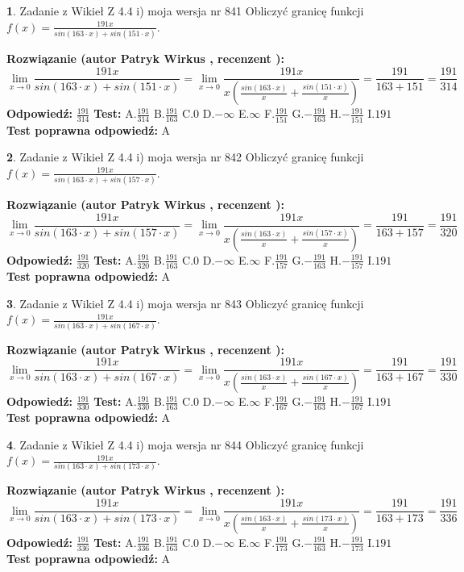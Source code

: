 \documentclass[12pt, a4paper]{article}
\theoremstyle{definition} %
\newtheorem{zad}{}
\newcommand{\zadStart}[1]{\begin{zad}#1\newline}
\newcommand{\zadStop}{\end{zad}}
\newcommand{\rozwStart}[2]{\noindent \textbf{Rozwiązanie (autor #1 , recenzent #2): }\newline}
\newcommand{\rozwStop}{\newline}
\newcommand{\odpStart}{\noindent \textbf{Odpowiedź:}\newline}
\newcommand{\odpStop}{\newline}
\newcommand{\testStart}{\noindent \textbf{Test:}\newline}
\newcommand{\testStop}{\newline}
\newcommand{\kluczStart}{\noindent \textbf{Test poprawna odpowiedź:}\newline}
\newcommand{\kluczStop}{\newline}
\begin{document}
\zadStart{Zadanie z Wikieł Z 4.4 i) moja wersja nr 841}
Obliczyć granicę funkcji $f(x)=\frac{191x}{sin(163\cdot x) +sin(151\cdot x)}$.
\zadStop
\rozwStart{Patryk Wirkus}{}
$$\lim\limits_{x\to 0}\frac{191x}{sin(163\cdot x) +sin(151\cdot x)}=\lim\limits_{x\to 0}\frac{191x}{x(\frac{sin(163\cdot x)}{x}+\frac{sin(151\cdot x)}{x})}=\frac{191}{163+151} = \frac{191}{314}$$
\rozwStop
\odpStart
$\frac{191}{314}$
\odpStop
\testStart
A.$\frac{191}{314}$
B.$\frac{191}{163}$
C.$0$
D.$-\infty$
E.$\infty$
F.$\frac{191}{151}$
G.$-\frac{191}{163}$
H.$-\frac{191}{151}$
I.$191$
\testStop
\kluczStart
A
\kluczStop



\zadStart{Zadanie z Wikieł Z 4.4 i) moja wersja nr 842}
Obliczyć granicę funkcji $f(x)=\frac{191x}{sin(163\cdot x) +sin(157\cdot x)}$.
\zadStop
\rozwStart{Patryk Wirkus}{}
$$\lim\limits_{x\to 0}\frac{191x}{sin(163\cdot x) +sin(157\cdot x)}=\lim\limits_{x\to 0}\frac{191x}{x(\frac{sin(163\cdot x)}{x}+\frac{sin(157\cdot x)}{x})}=\frac{191}{163+157} = \frac{191}{320}$$
\rozwStop
\odpStart
$\frac{191}{320}$
\odpStop
\testStart
A.$\frac{191}{320}$
B.$\frac{191}{163}$
C.$0$
D.$-\infty$
E.$\infty$
F.$\frac{191}{157}$
G.$-\frac{191}{163}$
H.$-\frac{191}{157}$
I.$191$
\testStop
\kluczStart
A
\kluczStop



\zadStart{Zadanie z Wikieł Z 4.4 i) moja wersja nr 843}
Obliczyć granicę funkcji $f(x)=\frac{191x}{sin(163\cdot x) +sin(167\cdot x)}$.
\zadStop
\rozwStart{Patryk Wirkus}{}
$$\lim\limits_{x\to 0}\frac{191x}{sin(163\cdot x) +sin(167\cdot x)}=\lim\limits_{x\to 0}\frac{191x}{x(\frac{sin(163\cdot x)}{x}+\frac{sin(167\cdot x)}{x})}=\frac{191}{163+167} = \frac{191}{330}$$
\rozwStop
\odpStart
$\frac{191}{330}$
\odpStop
\testStart
A.$\frac{191}{330}$
B.$\frac{191}{163}$
C.$0$
D.$-\infty$
E.$\infty$
F.$\frac{191}{167}$
G.$-\frac{191}{163}$
H.$-\frac{191}{167}$
I.$191$
\testStop
\kluczStart
A
\kluczStop



\zadStart{Zadanie z Wikieł Z 4.4 i) moja wersja nr 844}
Obliczyć granicę funkcji $f(x)=\frac{191x}{sin(163\cdot x) +sin(173\cdot x)}$.
\zadStop
\rozwStart{Patryk Wirkus}{}
$$\lim\limits_{x\to 0}\frac{191x}{sin(163\cdot x) +sin(173\cdot x)}=\lim\limits_{x\to 0}\frac{191x}{x(\frac{sin(163\cdot x)}{x}+\frac{sin(173\cdot x)}{x})}=\frac{191}{163+173} = \frac{191}{336}$$
\rozwStop
\odpStart
$\frac{191}{336}$
\odpStop
\testStart
A.$\frac{191}{336}$
B.$\frac{191}{163}$
C.$0$
D.$-\infty$
E.$\infty$
F.$\frac{191}{173}$
G.$-\frac{191}{163}$
H.$-\frac{191}{173}$
I.$191$
\testStop
\kluczStart
A
\kluczStop
\end{document}
